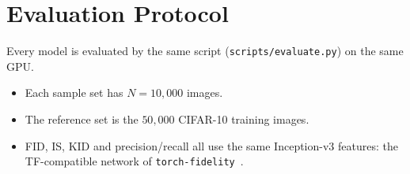 \section{Evaluation Protocol}
\label{sec:eval}

Every model is evaluated by the same script (\texttt{scripts/evaluate.py}) on the same GPU.
\begin{itemize}
  \item Each sample set has $N=10{,}000$ images.
  \item The reference set is the $50{,}000$ CIFAR-10 training images.
  \item FID, IS, KID and precision/recall all use the same Inception-v3 features: the TF-compatible network of
        \texttt{torch-fidelity}~\citep{obukhov2020torchfidelity}.
\end{itemize}

